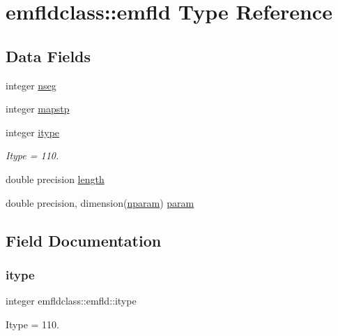 \hypertarget{structemfldclass_1_1emfld}{}\section{emfldclass\+::emfld Type Reference}
\label{structemfldclass_1_1emfld}
\subsection*{Data Fields}
\begin{DoxyCompactItemize}
\item 
integer \mbox{\hyperlink{structemfldclass_1_1emfld_a35f0c51ff70d545cef92bbbfa9546006}{nseg}}
\item 
integer \mbox{\hyperlink{structemfldclass_1_1emfld_ac18dfbe320fc1dc13393780eb0ae2613}{mapstp}}
\item 
integer \mbox{\hyperlink{structemfldclass_1_1emfld_aa9a88075072a030b64fd3878793b499b}{itype}}
\begin{DoxyCompactList}\small\item\em Itype = 110. \end{DoxyCompactList}\item 
double precision \mbox{\hyperlink{structemfldclass_1_1emfld_a4938896636fb9fa907f15b621831cf97}{length}}
\item 
double precision, dimension(\mbox{\hyperlink{namespaceemfldclass_ad6fed90f4153b92a9a9ff35a6ef146c3}{nparam}}) \mbox{\hyperlink{structemfldclass_1_1emfld_ac4480d690e4e4d88d88ba939af8213cd}{param}}
\end{DoxyCompactItemize}


\subsection{Field Documentation}
\mbox{\label{structemfldclass_1_1emfld_aa9a88075072a030b64fd3878793b499b}} 
\subsubsection{\texorpdfstring{itype}{itype}}
{\footnotesize\ttfamily integer emfldclass\+::emfld\+::itype}



Itype = 110. 

\mbox{\label{structemfldclass_1_1emfld_a4938896636fb9fa907f15b621831cf97}} 
